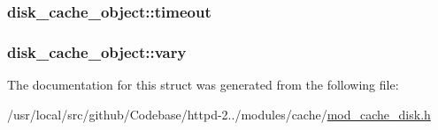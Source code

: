 \subsubsection[{\texorpdfstring{timeout}{timeout}}]{ disk\+\_\+cache\+\_\+object\+::timeout}\hypertarget{structdisk__cache__object_ae4a6a177068c910c9af3eebd66fbbb2c}{}\label{structdisk__cache__object_ae4a6a177068c910c9af3eebd66fbbb2c}
\subsubsection[{\texorpdfstring{vary}{vary}}]{ disk\+\_\+cache\+\_\+object\+::vary}\hypertarget{structdisk__cache__object_a65af1db919a11b480574e7b330e46987}{}\label{structdisk__cache__object_a65af1db919a11b480574e7b330e46987}


The documentation for this struct was generated from the following file\+:\begin{DoxyCompactItemize}
\item 
/usr/local/src/github/\+Codebase/httpd-\/2../modules/cache/\hyperlink{mod__cache__disk_8h}{mod\+\_\+cache\+\_\+disk.\+h}\end{DoxyCompactItemize}

